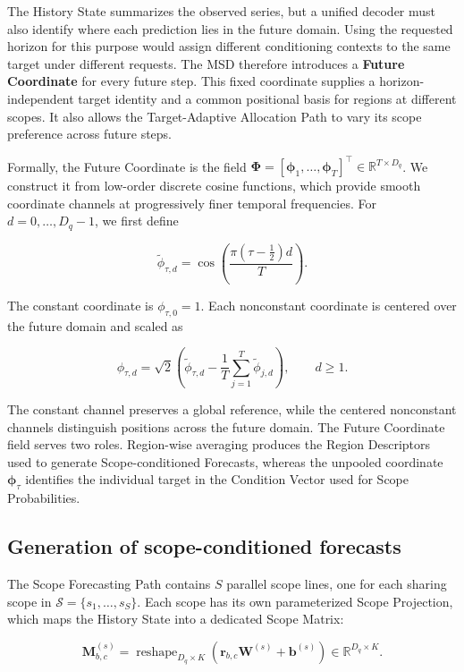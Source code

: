 \documentclass[final,3p,times]{elsarticle}
\newif\ifshowrevisions
\newcommand{\rev}[1]{\ifshowrevisions\textcolor{revisionblue}{#1}\else#1\fi}
\begin{document}
The History State summarizes the observed series, but a unified decoder must also identify where each prediction lies in the future domain. Using the requested horizon for this purpose would assign different conditioning contexts to the same target under different requests. \rev{The MSD therefore introduces a \textbf{Future Coordinate} for every future step.} This fixed coordinate supplies a horizon-independent target identity and a common positional basis for regions at different scopes. It also allows the Target-Adaptive Allocation Path to vary its scope preference across future steps.

Formally, the Future Coordinate is the field $\boldsymbol\Phi=[\boldsymbol\phi_1,\ldots,\boldsymbol\phi_T]^\top\in\mathbb R^{T\times D_q}$. We construct it from low-order discrete cosine functions, which provide smooth coordinate channels at progressively finer temporal frequencies. For $d=0,\ldots,D_q-1$, we first define

\[
\widetilde\phi_{\tau,d}
=
\cos\!\left(
\frac{\pi(\tau-\tfrac12)d}{T}
\right).
\]


The constant coordinate is $\phi_{\tau,0}=1$. Each nonconstant coordinate is centered over the future domain and scaled as

\[
\phi_{\tau,d}
=
\sqrt{2}
\left(
\widetilde\phi_{\tau,d}
-
\frac{1}{T}
\sum_{j=1}^{T}
\widetilde\phi_{j,d}
\right),
\qquad d\geq 1.
\]


The constant channel preserves a global reference, while the centered nonconstant channels distinguish positions across the future domain. The Future Coordinate field serves two roles. Region-wise averaging produces the Region Descriptors used to generate Scope-conditioned Forecasts, whereas the unpooled coordinate $\boldsymbol\phi_\tau$ identifies the individual target in the Condition Vector used for Scope Probabilities.

\subsection{Generation of scope-conditioned forecasts}


The Scope Forecasting Path contains $S$ parallel scope lines, one for each sharing scope in $\mathcal S=\{s_1,\ldots,s_S\}$. Each scope has its own parameterized Scope Projection, which maps the History State into a dedicated Scope Matrix:

\[
\mathbf M_{b,c}^{(s)}
=
\operatorname{reshape}_{D_q\times K}
\left(
\mathbf r_{b,c}\mathbf W^{(s)}
+
\mathbf b^{(s)}
\right)
\in\mathbb R^{D_q\times K}.
\]
\end{document}
